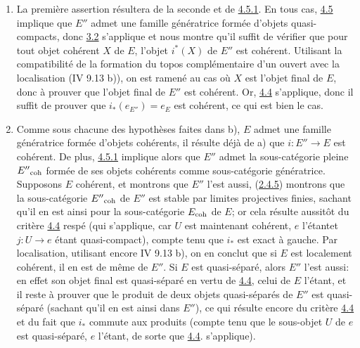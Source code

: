 \documentclass[10pt]{../fichiers-configuration-latex/smfart}
\begin{document}
\begin{enumerate}
\renewcommand{\theenumi}{\alph{enumi}}
\renewcommand{\labelenumi}{\theenumi)}
\item La première assertion résultera de la seconde et de \hyperref[VI.lem4.5.1]{4.5.1}. En
  tous cas, \hyperref[VI.cor4.5]{4.5} implique que $E''$ admet une famille génératrice
  formée d'objets quasi-compacts, donc \hyperref[VI.prop3.2]{3.2} s'applique et nous montre
  qu'il suffit de vérifier que pour tout objet cohérent $X$ de $E$,
  l'objet $i^{\ast}(X)$ de $E''$ est cohérent. Utilisant la
  compatibilité de la formation du topos complémentaire d'un ouvert
  avec la localisation (IV 9.13 b)), on est ramené au cas où $X$ est
  l'objet final de $E$, donc à prouver que l'objet final de $E''$ est
  cohérent. Or, \hyperref[VI.cor4.4]{4.4} s'applique, donc il suffit de prouver que
  $i_{\ast}(e_{E''}) = e_E$ est cohérent, ce qui est bien le cas.

\item Comme sous chacune des hypothèses faites dans b), $E$ admet une
  famille génératrice formée d'objets cohérents, il résulte déjà de a)
  que $i : E'' \to E$ est cohérent. De plus, \hyperref[VI.lem4.5.1]{4.5.1} implique alors que
  $E''$ admet la sous-catégorie pleine ${E''}_{\mathrm{coh}}$ formée de ses
  objets cohérents comme sous-catégorie génératrice. Supposons $E$
  cohérent, et montrons que $E''$ l'est aussi, \ie (\hyperref[VI.subsubsec2.4.5]{2.4.5}) montrons
  que la sous-catégorie ${E''}_{\mathrm{coh}}$ de $E''$ est stable par limites
  projectives finies, sachant qu'il en est ainsi pour la
  sous-catégorie $E_{\mathrm{coh}}$ de $E$; or cela résulte aussitôt du critère
  \hyperref[VI.cor4.4]{4.4} respé (qui s'applique, car $U$ est maintenant cohérent, $e$
  l'étant\pageoriginale et $j : U \to e$ étant quasi-compact), compte tenu que
  $i_{\ast}$ est exact à gauche. Par localisation, utilisant encore IV
  9.13 b), on en conclut que si $E$ est localement cohérent, il en est
  de même de $E''$. Si $E$ est quasi-séparé, alors $E''$ l'est aussi:
  en effet son objet final est quasi-séparé en vertu de \hyperref[VI.cor4.4]{4.4}, celui de
  $E$ l'étant, et il reste à prouver que le produit de deux objets
  quasi-séparés de $E''$ est quasi-séparé (sachant qu'il en est ainsi
  dans $E''$), ce qui résulte encore du critère \hyperref[VI.cor4.4]{4.4} et du fait que
  $i_{\ast}$ commute aux produits (compte tenu que le sous-objet $U$
  de $e$ est quasi-séparé, $e$ l'étant, de sorte que \hyperref[VI.cor4.4]{4.4}. s'applique).
\end{enumerate}
\end{document}
